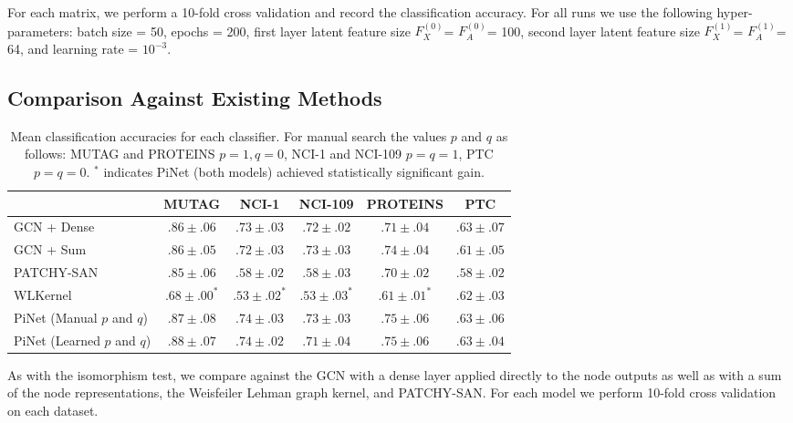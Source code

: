 \documentclass{article}
\theoremstyle{definition}
\begin{document}
For each matrix, we perform a 10-fold cross validation and record the classification accuracy. For all runs we use the following hyper-parameters: batch size = 50, epochs = 200, first layer latent feature size \small$F_X^{(0)}$\normalsize = \small$F_A^{(0)}$\normalsize = 100, second layer latent feature size \small$F_X^{(1)}$\normalsize = \small$F_A^{(1)}$\normalsize = 64, and learning rate = $10^{-3}$.

\subsection{Comparison Against Existing Methods}

\begin{table*}[b]
  \small
  \centering
\begin{tabular}{lccccc}
\toprule
 &            MUTAG &            NCI-1 &          NCI-109 &         PROTEINS &              PTC \\
\midrule
GCN + Dense &  $.86 \pm .06$ &  $.73 \pm .03$ &  $.72 \pm .02$ &  $.71 \pm .04$ &  $.63 \pm .07$ \\
GCN + Sum &  $.86 \pm .05$ &  $.72 \pm .03$ &  $.73 \pm .03$ &  $.74 \pm .04$ &  $.61 \pm .05$ \\
PATCHY-SAN & $.85 \pm .06$ & $.58 \pm .02$ & $.58 \pm .03$ & $.70 \pm .02$ & $.58 \pm .02$ \\
WLKernel   &  $.68 \pm .00^{*}$ &  $.53 \pm .02^{*}$ &  $.53 \pm .03^{*}$ &  $.61 \pm .01^{*}$ &  $.62 \pm .03$ \\
\midrule
PiNet (Manual $p$ and $q$) &  $.87 \pm .08$ &  $.74 \pm .03$ &  $.73 \pm .03$ &  $.75 \pm .06$ &  $.63 \pm .06$ \\
PiNet (Learned $p$ and $q$) &  $.88 \pm .07$ &  $.74 \pm .02$ &  $.71 \pm .04$ &  $.75 \pm .06$ &  $.63 \pm .04$ \\
\bottomrule
\end{tabular}
\caption{Mean classification accuracies for each classifier. For manual search the values $p$ and $q$ as follows: MUTAG and PROTEINS $p = 1, q = 0$, NCI-1 and NCI-109 $p = q = 1$, PTC $p = q = 0$. $^{*}$ indicates PiNet (both models) achieved statistically significant gain.}
\label{tbl:benchresults}
\end{table*}

As with the isomorphism test, we compare against the GCN with a dense layer applied directly to the node outputs as well as with a sum of the node representations, the Weisfeiler Lehman graph kernel, and PATCHY-SAN. For each model we perform 10-fold cross validation on each dataset.
\end{document}
